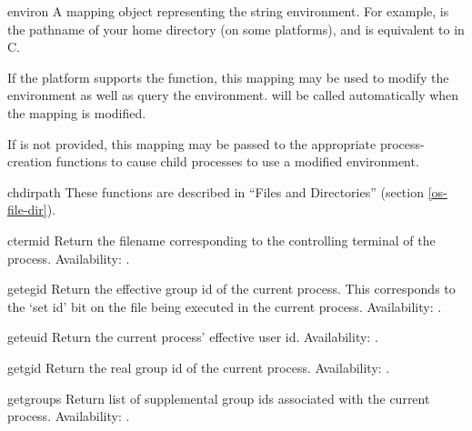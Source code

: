 \begin{datadesc}{environ}
A mapping object representing the string environment. For example,
 is the pathname of your home directory (on some
platforms), and is equivalent to  in C.

If the platform supports the  function, this
mapping may be used to modify the environment as well as query the
environment.   will be called automatically when
the mapping is modified.  

If  is not provided, this mapping may be passed to
the appropriate process-creation functions to cause child processes to
use a modified environment.
\end{datadesc}

\begin{funcdescni}{chdir}{path}
These functions are described in ``Files and Directories'' (section
\ref{os-file-dir}).
\end{funcdescni}

\begin{funcdesc}{ctermid}{}
Return the filename corresponding to the controlling terminal of the
process.
Availability: \UNIX.
\end{funcdesc}

\begin{funcdesc}{getegid}{}
Return the effective group id of the current process.  This
corresponds to the `set id' bit on the file being executed in the
current process.
Availability: \UNIX.
\end{funcdesc}

\begin{funcdesc}{geteuid}{}
Return the current process' effective user id.
Availability: \UNIX.
\end{funcdesc}

\begin{funcdesc}{getgid}{}
Return the real group id of the current process.
Availability: \UNIX.
\end{funcdesc}

\begin{funcdesc}{getgroups}{}
Return list of supplemental group ids associated with the current
process.
Availability: \UNIX.
\end{funcdesc}

